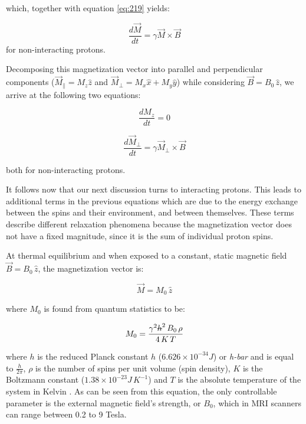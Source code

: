 which, together with equation \ref{eq:219} yields:

\begin{equation} \label{eq:221}
    \frac{d\vec{M}}{dt} = \gamma \vec{M} \times \vec{B}
\end{equation}
for non-interacting protons.

Decomposing this magnetization vector into parallel and perpendicular components ($\vec{M}_{\parallel} = M_z \hat{z}$ and $\vec{M}_{\perp} = M_x \hat{x} + M_y \hat{y}$) while considering $\vec{B} = B_0 \, \hat{z}$, we arrive at the following two equations:

\begin{equation} \label{eq:222}
    \frac{dM_z}{dt} = 0
\end{equation}

\begin{equation} \label{eq:223}
    \frac{d\vec{M}_{\perp}}{dt} = \gamma \vec{M}_{\perp} \times \vec{B}
\end{equation}

both for non-interacting protons.

It follows now that our next discussion turns to interacting protons. This leads to additional terms in the previous equations which are due to the energy exchange between the spins and their environment, and between themselves. These terms describe different relaxation phenomena because the magnetization vector does not have a fixed magnitude, since it is the sum of individual proton spins. 

At thermal equilibrium and when exposed to a constant, static magnetic field $\vec{B} = B_0 \, \hat{z}$, the magnetization vector is:

\begin{equation} \label{eq:224}
    \vec{M} = M_0 \, \hat{z}
\end{equation}

where $M_0$ is found from quantum statistics to be:

\begin{equation} \label{eq:225}
    M_0 = \frac{\gamma^2 \text{\sout{$h$}}^2 \, B_0 \, \rho}{4 \, K \, T}
\end{equation}

where \sout{$h$} is the reduced Planck constant $h$ ($6.626 \times 10^{-34} J$) or \textit{h-bar} and is equal to $\frac{h}{2 \pi}$, $\rho$ is the number of spins per unit volume (spin density), $K$ is the Boltzmann constant ($1.38 \times 10^{-23} J \, K^{-1}$) and $T$ is the absolute temperature of the system in Kelvin \cite{Haacke1999}. As can be seen from this equation, the only controllable parameter is the external magnetic field's strength, or $B_0$, which in MRI scanners can range between 0.2 to 9 Tesla. 

